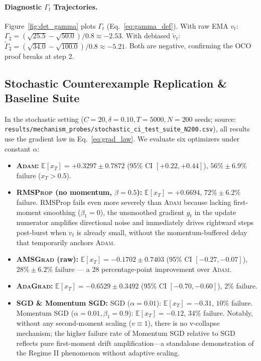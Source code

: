 \paragraph{Diagnostic $\Gamma_t$ Trajectories.}
Figure~\ref{fig:det_gamma} plots $\Gamma_t$ (Eq.~\ref{eq:gamma_def}). With raw EMA $v_t$: $\Gamma_2 = (\sqrt{25.5}-\sqrt{50.0})/0.8 \approx -2.53$. With debiased $\tilde{v}_t$: $\tilde{\Gamma}_2 = (\sqrt{34.0}-\sqrt{100.0})/0.8 \approx -5.21$. Both are negative, confirming the OCO proof breaks at step 2.

\subsection{Stochastic Counterexample Replication \& Baseline Suite}
In the stochastic setting ($C=20, \delta=0.10, T=5000, N=200$ seeds; source: \nolinkurl{results/mechanism_probes/stochastic_ci_test_suite_N200.csv}), all results use the gradient law in Eq.~\eqref{eq:grad_law}. We evaluate six optimizers under constant $\alpha$:
\begin{itemize}
    \item \textbf{\textsc{Adam}:} $\mathbb{E}[x_T] = +0.3297 \pm 0.7872$ (95\% CI $[+0.22, +0.44]$), $56\% \pm 6.9\%$ failure ($x_T > 0.5$).
    \item \textbf{\textsc{RMSProp} (no momentum, $\beta=0.5$):} $\mathbb{E}[x_T] = +0.6694$, $72\% \pm 6.2\%$ failure. RMSProp fails even more severely than \textsc{Adam} because lacking first-moment smoothing ($\beta_1=0$), the unsmoothed gradient $g_t$ in the update numerator amplifies directional noise and immediately drives rightward steps post-burst when $v_t$ is already small, without the momentum-buffered delay that temporarily anchors \textsc{Adam}.
    \item \textbf{\textsc{AMSGrad} (raw):} $\mathbb{E}[x_T] = -0.1702 \pm 0.7403$ (95\% CI $[-0.27, -0.07]$), $28\% \pm 6.2\%$ failure --- a 28 percentage-point improvement over \textsc{Adam}.
    \item \textbf{\textsc{AdaGrad}:} $\mathbb{E}[x_T] = -0.6529 \pm 0.3492$ (95\% CI $[-0.70, -0.60]$), $2\%$ failure.
    \item \textbf{\textsc{SGD} \& Momentum \textsc{SGD}:} SGD ($\alpha=0.01$): $\mathbb{E}[x_T]=-0.31$, $10\%$ failure. Momentum SGD ($\alpha=0.01, \beta_1=0.9$): $\mathbb{E}[x_T]=-0.12$, $34\%$ failure. Notably, without any second-moment scaling ($v \equiv 1$), there is no v-collapse mechanism; the higher failure rate of Momentum SGD relative to SGD reflects pure first-moment drift amplification---a standalone demonstration of the Regime II phenomenon without adaptive scaling.
\end{itemize}

